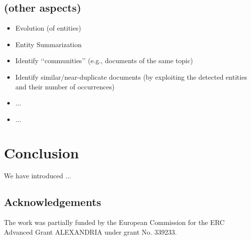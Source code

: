 \documentclass[runningheads,a4paper]{libtex/llncs}
\newcommand{\q}[1]{\lq\lq{}{}#1\rq\rq{}{}}
\begin{document}

\subsection{(other aspects)}

\begin{itemize}
\item   Evolution (of entities)
\item   Entity Summarization
\item   Identify \q{communities} (e.g., documents of the same topic)
\item   Identify similar/near-duplicate documents
        (by exploiting the detected entities and their number of occurrences)
\item   ...
\item   ...
\end{itemize}

\section{Conclusion}
\label{sec:concl}

We have introduced ...


\subsection*{Acknowledgements} The work was partially funded by the
European Commission for the ERC Advanced Grant ALEXANDRIA under
grant No. 339233.




\end{document}
